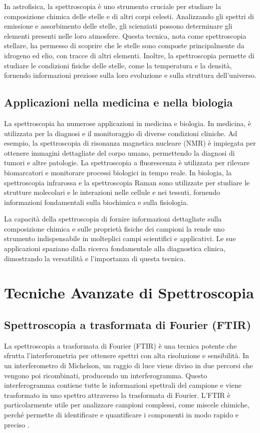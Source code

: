 \documentclass[12pt,a4paper]{report}
\begin{document}
In astrofisica, la spettroscopia è uno strumento cruciale per studiare la composizione chimica delle stelle e di altri corpi celesti. Analizzando gli spettri di emissione e assorbimento delle stelle, gli scienziati possono determinare gli elementi presenti nelle loro atmosfere. Questa tecnica, nota come spettroscopia stellare, ha permesso di scoprire che le stelle sono composte principalmente da idrogeno ed elio, con tracce di altri elementi. Inoltre, la spettroscopia permette di studiare le condizioni fisiche delle stelle, come la temperatura e la densità, fornendo informazioni preziose sulla loro evoluzione e sulla struttura dell'universo.

\subsection{Applicazioni nella medicina e nella biologia}

La spettroscopia ha numerose applicazioni in medicina e biologia. In medicina, è utilizzata per la diagnosi e il monitoraggio di diverse condizioni cliniche. Ad esempio, la spettroscopia di risonanza magnetica nucleare (NMR) è impiegata per ottenere immagini dettagliate del corpo umano, permettendo la diagnosi di tumori e altre patologie. La spettroscopia a fluorescenza è utilizzata per rilevare biomarcatori e monitorare processi biologici in tempo reale. In biologia, la spettroscopia infrarossa e la spettroscopia Raman sono utilizzate per studiare le strutture molecolari e le interazioni nelle cellule e nei tessuti, fornendo informazioni fondamentali sulla biochimica e sulla fisiologia.

La capacità della spettroscopia di fornire informazioni dettagliate sulla composizione chimica e sulle proprietà fisiche dei campioni la rende uno strumento indispensabile in molteplici campi scientifici e applicativi. Le sue applicazioni spaziano dalla ricerca fondamentale alla diagnostica clinica, dimostrando la versatilità e l'importanza di questa tecnica.

\section{Tecniche Avanzate di Spettroscopia}

\subsection{Spettroscopia a trasformata di Fourier (FTIR)}

La spettroscopia a trasformata di Fourier (FTIR) è una tecnica potente che sfrutta l'interferometria per ottenere spettri con alta risoluzione e sensibilità. In un interferometro di Michelson, un raggio di luce viene diviso in due percorsi che vengono poi ricombinati, producendo un interferogramma. Questo interferogramma contiene tutte le informazioni spettrali del campione e viene trasformato in uno spettro attraverso la trasformata di Fourier. L'FTIR è particolarmente utile per analizzare campioni complessi, come miscele chimiche, perché permette di identificare e quantificare i componenti in modo rapido e preciso \cite{griffiths2007fourier}.
\end{document}
